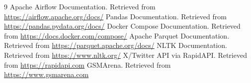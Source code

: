\documentclass[11pt,a4paper]{article}
\begin{document}
\begin{thebibliography}{9}
 Apache Airflow Documentation. Retrieved from \url{https://airflow.apache.org/docs/}
 Pandas Documentation. Retrieved from \url{https://pandas.pydata.org/docs/}
 Docker Compose Documentation. Retrieved from \url{https://docs.docker.com/compose/}
 Apache Parquet Documentation. Retrieved from \url{https://parquet.apache.org/docs/}
 NLTK Documentation. Retrieved from \url{https://www.nltk.org/}
 X/Twitter API via RapidAPI. Retrieved from \url{https://rapidapi.com}
 GSMArena. Retrieved from \url{https://www.gsmarena.com}
\end{thebibliography}
\end{document}
